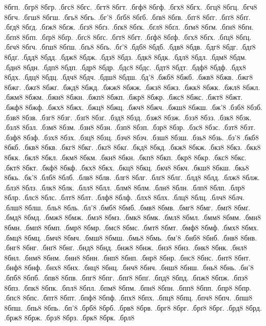 {8бгп.
.бгр8
8бгр.
.бгс8
8бгс.
.бгт8
8бгт.
.бгф8
8бгф.
.бгх8
8бгх.
.бгц8
8бгц.
.бгч8
8бгч.
.бгш8
8бгш.
.бгь8
8бгь.
.бг'8
.бґб8
8бґб.
.бґв8
8бґв.
.бґг8
8бґг.
.бґґ8
8бґґ.
.бґд8
8бґд.
.бґж8
8бґж.
.бґз8
8бґз.
.бґк8
8бґк.
.бґл8
8бґл.
.бґм8
8бґм.
.бґн8
8бґн.
.бґп8
8бґп.
.бґр8
8бґр.
.бґс8
8бґс.
.бґт8
8бґт.
.бґф8
8бґф.
.бґх8
8бґх.
.бґц8
8бґц.
.бґч8
8бґч.
.бґш8
8бґш.
.бґь8
8бґь.
.бґ'8
.бдб8
8бдб.
.бдв8
8бдв.
.бдг8
8бдг.
.бдґ8
8бдґ.
.бдд8
8бдд.
.бдж8
8бдж.
.бдз8
8бдз.
.бдк8
8бдк.
.бдл8
8бдл.
.бдм8
8бдм.
.бдн8
8бдн.
.бдп8
8бдп.
.бдр8
8бдр.
.бдс8
8бдс.
.бдт8
8бдт.
.бдф8
8бдф.
.бдх8
8бдх.
.бдц8
8бдц.
.бдч8
8бдч.
.бдш8
8бдш.
.бд'8
.бжб8
8бжб.
.бжв8
8бжв.
.бжг8
8бжг.
.бжґ8
8бжґ.
.бжд8
8бжд.
.бжж8
8бжж.
.бжз8
8бжз.
.бжк8
8бжк.
.бжл8
8бжл.
.бжм8
8бжм.
.бжн8
8бжн.
.бжп8
8бжп.
.бжр8
8бжр.
.бжс8
8бжс.
.бжт8
8бжт.
.бжф8
8бжф.
.бжх8
8бжх.
.бжц8
8бжц.
.бжч8
8бжч.
.бжш8
8бжш.
.бж'8
.бзб8
8бзб.
.бзв8
8бзв.
.бзг8
8бзг.
.бзґ8
8бзґ.
.бзд8
8бзд.
.бзж8
8бзж.
.бзз8
8бзз.
.бзк8
8бзк.
.бзл8
8бзл.
.бзм8
8бзм.
.бзн8
8бзн.
.бзп8
8бзп.
.бзр8
8бзр.
.бзс8
8бзс.
.бзт8
8бзт.
.бзф8
8бзф.
.бзх8
8бзх.
.бзц8
8бзц.
.бзч8
8бзч.
.бзш8
8бзш.
.бзь8
8бзь.
.бз'8
.бкб8
8бкб.
.бкв8
8бкв.
.бкг8
8бкг.
.бкґ8
8бкґ.
.бкд8
8бкд.
.бкж8
8бкж.
.бкз8
8бкз.
.бкк8
8бкк.
.бкл8
8бкл.
.бкм8
8бкм.
.бкн8
8бкн.
.бкп8
8бкп.
.бкр8
8бкр.
.бкс8
8бкс.
.бкт8
8бкт.
.бкф8
8бкф.
.бкх8
8бкх.
.бкц8
8бкц.
.бкч8
8бкч.
.бкш8
8бкш.
.бкь8
8бкь.
.бк'8
.блб8
8блб.
.блв8
8блв.
.блг8
8блг.
.блґ8
8блґ.
.блд8
8блд.
.блж8
8блж.
.блз8
8блз.
.блк8
8блк.
.блл8
8блл.
.блм8
8блм.
.блн8
8блн.
.блп8
8блп.
.блр8
8блр.
.блс8
8блс.
.блт8
8блт.
.блф8
8блф.
.блх8
8блх.
.блц8
8блц.
.блч8
8блч.
.блш8
8блш.
.бль8
8бль.
.бл'8
.бмб8
8бмб.
.бмв8
8бмв.
.бмг8
8бмг.
.бмґ8
8бмґ.
.бмд8
8бмд.
.бмж8
8бмж.
.бмз8
8бмз.
.бмк8
8бмк.
.бмл8
8бмл.
.бмм8
8бмм.
.бмн8
8бмн.
.бмп8
8бмп.
.бмр8
8бмр.
.бмс8
8бмс.
.бмт8
8бмт.
.бмф8
8бмф.
.бмх8
8бмх.
.бмц8
8бмц.
.бмч8
8бмч.
.бмш8
8бмш.
.бмь8
8бмь.
.бм'8
.бнб8
8бнб.
.бнв8
8бнв.
.бнг8
8бнг.
.бнґ8
8бнґ.
.бнд8
8бнд.
.бнж8
8бнж.
.бнз8
8бнз.
.бнк8
8бнк.
.бнл8
8бнл.
.бнм8
8бнм.
.бнн8
8бнн.
.бнп8
8бнп.
.бнр8
8бнр.
.бнс8
8бнс.
.бнт8
8бнт.
.бнф8
8бнф.
.бнх8
8бнх.
.бнц8
8бнц.
.бнч8
8бнч.
.бнш8
8бнш.
.бнь8
8бнь.
.бн'8
.бпб8
8бпб.
.бпв8
8бпв.
.бпг8
8бпг.
.бпґ8
8бпґ.
.бпд8
8бпд.
.бпж8
8бпж.
.бпз8
8бпз.
.бпк8
8бпк.
.бпл8
8бпл.
.бпм8
8бпм.
.бпн8
8бпн.
.бпп8
8бпп.
.бпр8
8бпр.
.бпс8
8бпс.
.бпт8
8бпт.
.бпф8
8бпф.
.бпх8
8бпх.
.бпц8
8бпц.
.бпч8
8бпч.
.бпш8
8бпш.
.бпь8
8бпь.
.бп'8
.брб8
8брб.
.брв8
8брв.
.брг8
8брг.
.брґ8
8брґ.
.брд8
8брд.
.брж8
8брж.
.брз8
8брз.
.брк8
8брк.
.брл8
}
